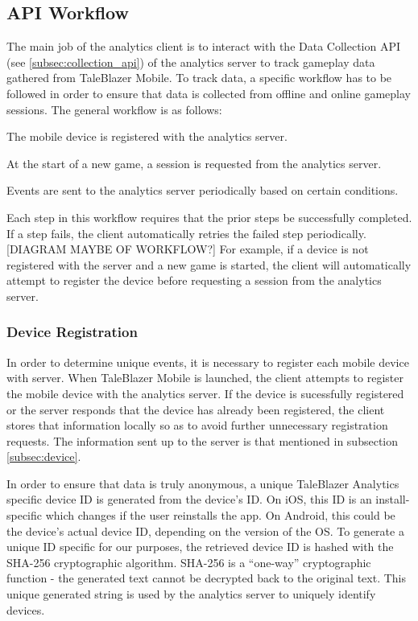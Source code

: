 \subsection{API Workflow}

The main job of the analytics client is to interact with the Data Collection API (see \ref{subsec:collection_api}) of the analytics server to track gameplay data gathered from TaleBlazer Mobile. To track data, a specific workflow has to be followed in order to ensure that data is collected from offline and online gameplay sessions. The general workflow is as follows:
	\begin{description}
		\item The mobile device is registered with the analytics server.
		\item At the start of a new game, a session is requested from the analytics server.
		\item Events are sent to the analytics server periodically based on certain conditions.
	\end{description}
Each step in this workflow requires that the prior steps be successfully completed. If a step fails, the client automatically retries the failed step periodically. [DIAGRAM MAYBE OF WORKFLOW?] For example, if a device is not registered with the server and a new game is started, the client will automatically attempt to register the device before requesting a session from the analytics server.

\subsubsection{Device Registration}

In order to determine unique events, it is necessary to register each mobile device with server. When TaleBlazer Mobile is launched, the client attempts to register the mobile device with the analytics server.
If the device is sucessfully registered or the server responds that the device has already been registered, the client stores that information locally so as to avoid further unnecessary registration requests. The information sent up to the server is that mentioned in subsection \ref{subsec:device}. 

In order to ensure that data is truly anonymous, a unique TaleBlazer Analytics specific device ID is generated from the device's ID. On iOS, this ID is an install-specific which changes if the user reinstalls the app. On Android, this could be the device's actual device ID, depending on the version of the OS. To generate a unique ID specific for our purposes, the retrieved device ID is hashed with the SHA-256 cryptographic algorithm. SHA-256 is a ``one-way'' cryptographic function - the generated text cannot be decrypted back to the original text. This unique generated string is used by the analytics server to uniquely identify devices. 


